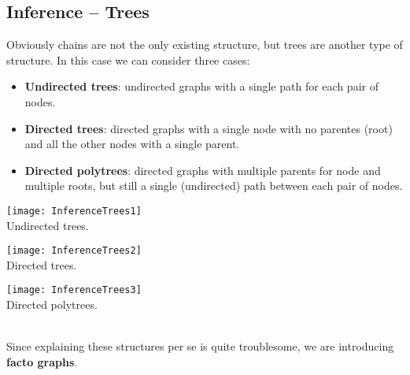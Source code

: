 \subsection{Inference -- Trees}
Obviously chains are not the only existing structure, but trees are another type of structure. In this case we can consider three cases:
\begin{itemize}
  \item \textbf{Undirected trees}: undirected graphs with a single path for each pair of nodes.
  \item \textbf{Directed trees}: directed graphs with a single node with no parentes (root) and all the other nodes with a single parent.
  \item \textbf{Directed polytrees}: directed graphs with multiple parents for node and multiple roots, but still a single (undirected) path between each pair of nodes. 
\end{itemize}
\begin{minipage}[htp]{\linewidth}
  \begin{center}
    \begin{minipage}{0.3\linewidth}
      \begin{center}
        \texttt{[image: InferenceTrees1]}\\
        Undirected trees.
      \end{center}
    \end{minipage}
    \hspace{0.01\linewidth}
    \begin{minipage}{0.3\linewidth}
      \begin{center}
        \texttt{[image: InferenceTrees2]}\\
        Directed trees.
      \end{center}
    \end{minipage}
    \hspace{0.01\linewidth}
    \begin{minipage}{0.3\linewidth}
      \begin{center}
        \texttt{[image: InferenceTrees3]}\\
        Directed polytrees.    
      \end{center}
    \end{minipage}
  \end{center}
\end{minipage}\\
\vspace{0.3cm}
Since explaining these structures per se is quite troublesome, we are introducing \textbf{facto graphs}.
%
%
